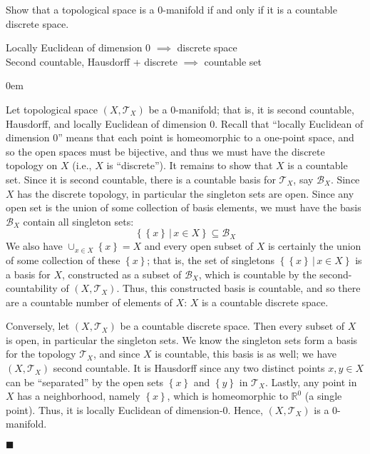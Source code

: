 \documentclass[12pt]{article}
\renewcommand{\qed}{\hfill$\blacksquare$}
\renewenvironment{proof}{\begin{addmargin}[1em]{0em}\begin{newproof}}{\end{newproof}\end{addmargin}\qed}
\newenvironment{exercise}[2][Exercise]{\begin{trivlist}
\item[\hskip \labelsep {\bfseries #1}\hskip \labelsep {\bfseries #2.}]}{\end{trivlist}}
\begin{document}
\begin{exercise}{2.54}
Show that a topological space is a $0$-manifold if and only if it is a countable discrete space.
\end{exercise}
{\color{red} Locally Euclidean of dimension 0 $\implies$ discrete space} \\
{\color{red} Second countable, Hausdorff + discrete $\implies$ countable set } \\

\begin{proof}
Let topological space $\left(X,\mathcal{T}_X\right)$ be a $0$-manifold; that is, it is second countable, Hausdorff, and locally Euclidean of dimension $0$. Recall that ``locally Euclidean of dimension $0$'' means that each point is homeomorphic to a one-point space, and so the open spaces must be bijective, and thus we must have the discrete topology on $X$ (i.e., $X$ is ``discrete''). It remains to show that $X$ is a countable set. Since it is second countable, there is a countable basis for $\mathcal{T}_X$, say $\mathcal{B}_X$. Since $X$ has the discrete topology, in particular the singleton sets are open. Since any open set is the union of some collection of basis elements, we must have the basis $\mathcal{B}_X$ contain all singleton sets:
$$ \left\{ \left\{x\right\} \, | \, x\in X \right\} \subseteq \mathcal{B}_X $$ We also have $\cup_{x\in X} \left\{ x\right\} = X$ and every open subset of $X$ is certainly the union of some collection of these $\left\{x\right\}$; that is, the set of singletons $\left\{ \left\{x\right\} \, | \, x\in X\right\}$ is a basis for $X$, constructed as a subset of $\mathcal{B}_X$, which is countable by the second-countability of $\left(X,\mathcal{T}_X\right)$. Thus, this constructed basis is countable, and so there are a countable number of elements of $X$: $X$ is a countable discrete space.

Conversely, let $\left(X,\mathcal{T}_X\right)$ be a countable discrete space. Then every subset of $X$ is open, in particular the singleton sets. We know the singleton sets form a basis for the topology $\mathcal{T}_X$, and since $X$ is countable, this basis is as well; we have $\left(X,\mathcal{T}_X\right)$ second countable. It is Hausdorff since any two distinct points $x,y\in X$ can be ``separated'' by the open sets $\left\{x\right\}$ and $\left\{y\right\}$ in $\mathcal{T}_X$. Lastly, any point in $X$ has a neighborhood, namely $\left\{x\right\}$, which is homeomorphic to $\mathbb{R}^0$ (a single point). Thus, it is locally Euclidean of dimension-0. Hence, $\left(X,\mathcal{T}_X\right)$ is a $0$-manifold.
\end{proof}
\end{document}
